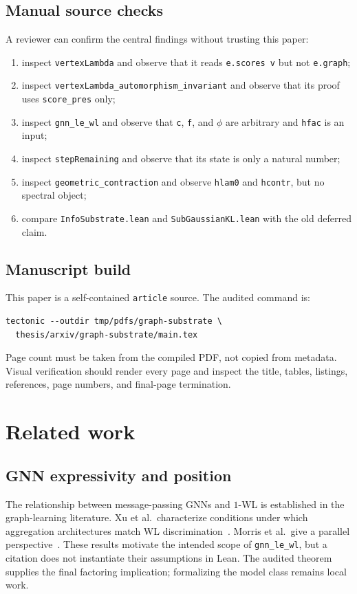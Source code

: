\documentclass[10pt,letterpaper]{article}
\theoremstyle{definition}
\begin{document}
\subsection{Manual source checks}
A reviewer can confirm the central findings without trusting this paper:
\begin{enumerate}
\item inspect \texttt{vertexLambda} and observe that it reads
  \texttt{e.scores v} but not \texttt{e.graph};
\item inspect \texttt{vertexLambda\_automorphism\_invariant} and observe that
  its proof uses \texttt{score\_pres} only;
\item inspect \texttt{gnn\_le\_wl} and observe that \texttt{c}, \texttt{f},
  and \(\phi\) are arbitrary and \texttt{hfac} is an input;
\item inspect \texttt{stepRemaining} and observe that its state is only a
  natural number;
\item inspect \texttt{geometric\_contraction} and observe
  \texttt{hlam0} and \texttt{hcontr}, but no spectral object;
\item compare \texttt{InfoSubstrate.lean} and
  \texttt{SubGaussianKL.lean} with the old deferred claim.
\end{enumerate}

\subsection{Manuscript build}
This paper is a self-contained \texttt{article} source. The audited command is:
\begin{lstlisting}[language={},caption={Manuscript compilation used for page verification.}]
tectonic --outdir tmp/pdfs/graph-substrate \
  thesis/arxiv/graph-substrate/main.tex
\end{lstlisting}
Page count must be taken from the compiled PDF, not copied from metadata.
Visual verification should render every page and inspect the title, tables,
listings, references, page numbers, and final-page termination.

\section{Related work}\label{sec:related}
\subsection{GNN expressivity and position}
The relationship between message-passing GNNs and \(1\)-WL is established in
the graph-learning literature. Xu et al.\ characterize conditions under which
aggregation architectures match WL discrimination~\cite{xu2019gin}.
Morris et al.\ give a parallel perspective~\cite{morris2019wl}. These results
motivate the intended scope of \texttt{gnn\_le\_wl}, but a citation does not
instantiate their assumptions in Lean. The audited theorem supplies the final
factoring implication; formalizing the model class remains local work.
\end{document}
